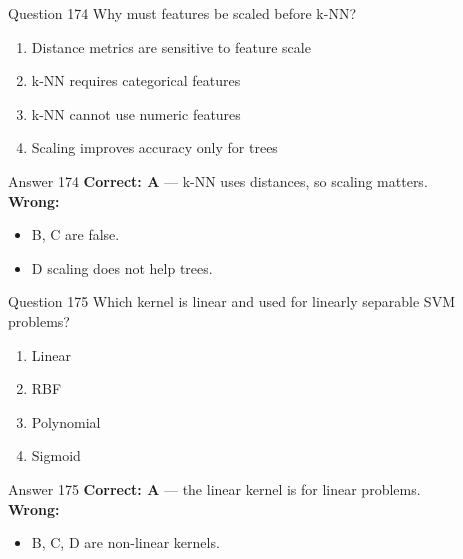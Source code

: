 \documentclass[aspectratio=169,11pt]{beamer}
\begin{document}
	\begin{frame}{Question 174}
		Why must features be scaled before k-NN?
		\begin{enumerate}[label=\Alph*.]
			\item Distance metrics are sensitive to feature scale
			\item k-NN requires categorical features
			\item k-NN cannot use numeric features
			\item Scaling improves accuracy only for trees
		\end{enumerate}
	\end{frame}
	\begin{frame}{Answer 174}
		\textbf{Correct: A} --- k-NN uses distances, so scaling matters.\\
		\vspace{0.5em}
		\textbf{Wrong:}
		\begin{itemize}
			\item B, C are false.
			\item D scaling does not help trees.
		\end{itemize}
	\end{frame}
	
	\begin{frame}{Question 175}
		Which kernel is linear and used for linearly separable SVM problems?
		\begin{enumerate}[label=\Alph*.]
			\item Linear
			\item RBF
			\item Polynomial
			\item Sigmoid
		\end{enumerate}
	\end{frame}
	\begin{frame}{Answer 175}
		\textbf{Correct: A} --- the linear kernel is for linear problems.\\
		\vspace{0.5em}
		\textbf{Wrong:}
		\begin{itemize}
			\item B, C, D are non-linear kernels.
		\end{itemize}
	\end{frame}
	
\end{document}
